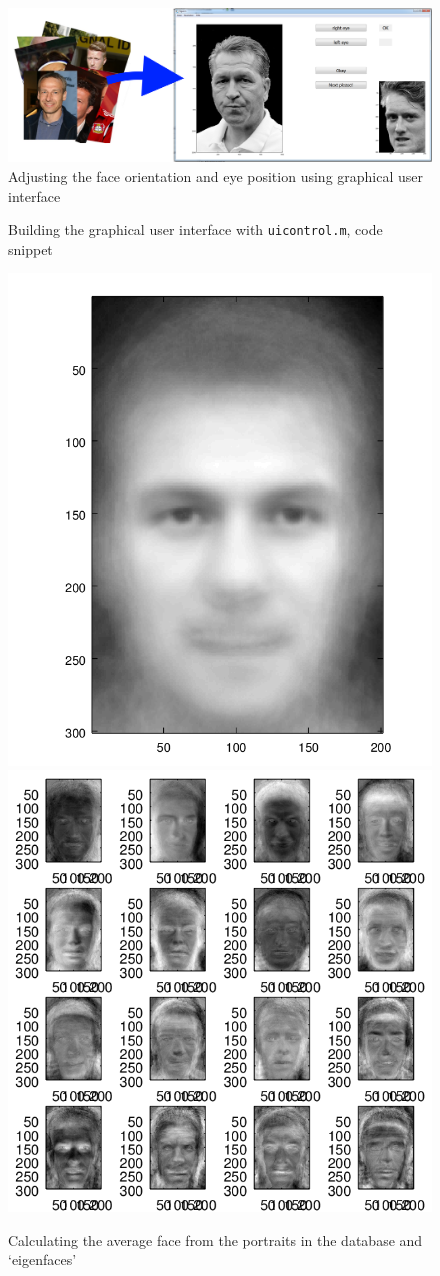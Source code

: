 \documentclass{beamer}
\begin{document}
\begin{frame}[t]{}
\begin{multicols}{5}
\begin{figure}
\includegraphics[width=0.95\hsize]{GUIalles.png} %
\caption{Adjusting the face orientation and eye position using graphical user interface}
\end{figure}

\begin{figure}
\caption{Building the graphical user interface with \texttt{uicontrol.m}, code snippet
        }
\end{figure}


\begin{figure}
\includegraphics[height=0.53\hsize]{avrgface.png} \hfill
\includegraphics[height=0.53\hsize]{eigenfaces.png}
\caption{Calculating the average face from the portraits in the database and `eigenfaces'}
\end{figure}



\end{multicols}
\end{frame}
\end{document}
